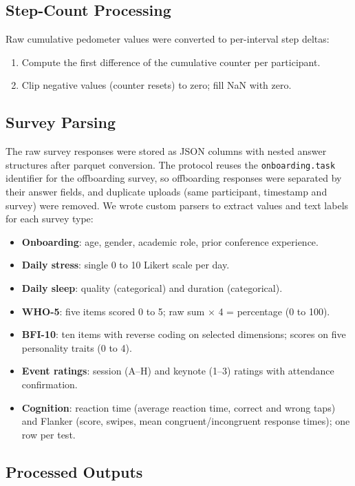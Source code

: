 \documentclass[11pt,a4paper]{article}
\begin{document}
\subsection{Step-Count Processing}

Raw cumulative pedometer values were converted to per-interval step deltas:
\begin{enumerate}
    \item Compute the first difference of the cumulative counter per participant.
    \item Clip negative values (counter resets) to zero; fill NaN with zero.
\end{enumerate}

\subsection{Survey Parsing}

The raw survey responses were stored as JSON columns with nested answer structures after parquet conversion.
The protocol reuses the \texttt{onboarding.task} identifier for the offboarding survey, so offboarding responses were separated by their answer fields, and duplicate uploads (same participant, timestamp and survey) were removed.
We wrote custom parsers to extract values and text labels for each survey type:
\begin{itemize}
    \item \textbf{Onboarding}: age, gender, academic role, prior conference experience.
    \item \textbf{Daily stress}: single 0 to 10 Likert scale per day.
    \item \textbf{Daily sleep}: quality (categorical) and duration (categorical).
    \item \textbf{WHO-5}: five items scored 0 to 5; raw sum $\times$ 4 = percentage (0 to 100).
    \item \textbf{BFI-10}: ten items with reverse coding on selected dimensions; scores on five personality traits (0 to 4).
    \item \textbf{Event ratings}: session (A--H) and keynote (1--3) ratings with attendance confirmation.
    \item \textbf{Cognition}: reaction time (average reaction time, correct and wrong taps) and Flanker (score, swipes, mean congruent/incongruent response times); one row per test.
\end{itemize}

\subsection{Processed Outputs}
\end{document}
